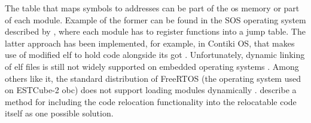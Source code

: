 The table that maps symbols to addresses can be part of the \gls{os} memory or part of each module. Example of the former can be found in the SOS operating system described by \textcite{Han2005}, where each module has to register functions into a jump table. The latter approach has been implemented, for example, in Contiki OS, that makes use of modified \gls{elf} to hold code alongside its \gls{got} \cite{Dunkels2006}. Unfortunately, dynamic linking of \gls{elf} files is still not widely supported on embedded operating systems \cite{Xinyu2017}. Among others like it, the standard distribution of FreeRTOS (the operating system used on ESTCube-2 \gls{obc}) does not support loading modules dynamically \cite{Barry2005}. \textcite{Xinyu2017} describe a method for including the code relocation functionality into the relocatable code itself as one possible solution.

